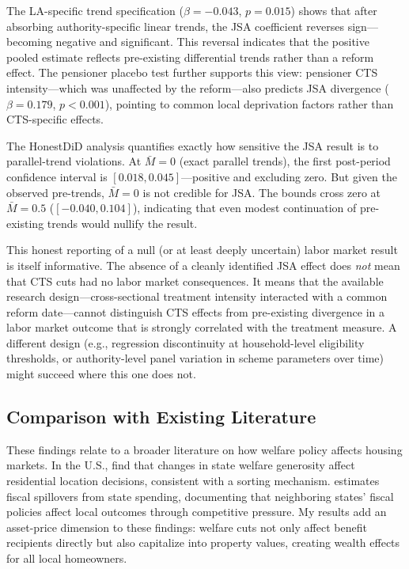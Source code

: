 \documentclass[12pt]{article}
\begin{document}
The LA-specific trend specification ($\beta = -0.043$, $p = 0.015$) shows that after absorbing authority-specific linear trends, the JSA coefficient reverses sign---becoming negative and significant. This reversal indicates that the positive pooled estimate reflects pre-existing differential trends rather than a reform effect. The pensioner placebo test further supports this view: pensioner CTS intensity---which was unaffected by the reform---also predicts JSA divergence ($\beta = 0.179$, $p < 0.001$), pointing to common local deprivation factors rather than CTS-specific effects.

The HonestDiD analysis quantifies exactly how sensitive the JSA result is to parallel-trend violations. At $\bar{M} = 0$ (exact parallel trends), the first post-period confidence interval is $[0.018, 0.045]$---positive and excluding zero. But given the observed pre-trends, $\bar{M} = 0$ is not credible for JSA. The bounds cross zero at $\bar{M} = 0.5$ ($[-0.040, 0.104]$), indicating that even modest continuation of pre-existing trends would nullify the result.

This honest reporting of a null (or at least deeply uncertain) labor market result is itself informative. The absence of a cleanly identified JSA effect does \textit{not} mean that CTS cuts had no labor market consequences. It means that the available research design---cross-sectional treatment intensity interacted with a common reform date---cannot distinguish CTS effects from pre-existing divergence in a labor market outcome that is strongly correlated with the treatment measure. A different design (e.g., regression discontinuity at household-level eligibility thresholds, or authority-level panel variation in scheme parameters over time) might succeed where this one does not.

\subsection{Comparison with Existing Literature}

These findings relate to a broader literature on how welfare policy affects housing markets. In the U.S., \citet{figlio2004} find that changes in state welfare generosity affect residential location decisions, consistent with a sorting mechanism. \citet{baicker2005} estimates fiscal spillovers from state spending, documenting that neighboring states' fiscal policies affect local outcomes through competitive pressure. My results add an asset-price dimension to these findings: welfare cuts not only affect benefit recipients directly but also capitalize into property values, creating wealth effects for all local homeowners.
\end{document}
